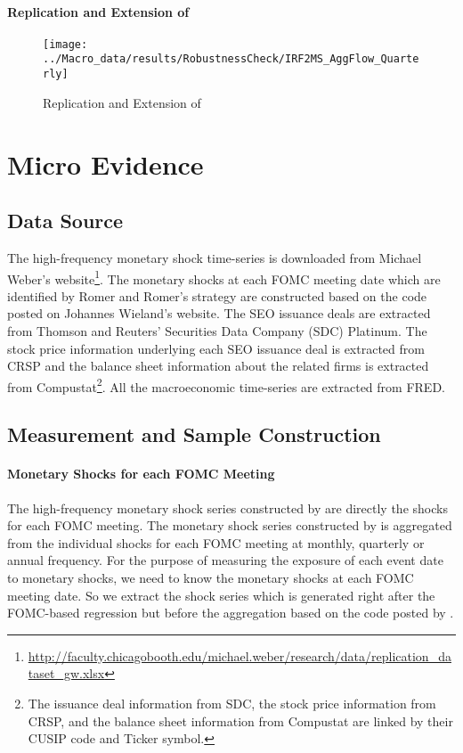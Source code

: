 \documentclass[11pt]{article}
\begin{document}
\paragraph{Replication and Extension of \cite{RomerRomer:AER:2004}}
\begin{figure}
	\centering
	\texttt{[image: ../Macro\_data/results/RobustnessCheck/IRF2MS\_AggFlow\_Quarterly]}
	\caption{Replication and Extension of \cite{RomerRomer:AER:2004}}
	\label{fig:irf2msaggflowquarterly}
\end{figure}

\section{Micro Evidence}

\subsection{Data Source}
The high-frequency monetary shock time-series is downloaded from Michael Weber's website\footnote{\url{http://faculty.chicagobooth.edu/michael.weber/research/data/replication_dataset_gw.xlsx}}. The monetary shocks at each FOMC meeting date which are identified by Romer and Romer's strategy are constructed based on the code posted on Johannes Wieland's website.  The SEO issuance deals are extracted from Thomson and Reuters' Securities Data Company (SDC) Platinum. The stock price information underlying each SEO issuance deal is extracted from CRSP and the balance sheet information about the related firms is extracted from Compustat\footnote{The issuance deal information from SDC, the stock price information from CRSP, and the balance sheet information from Compustat are linked by their CUSIP code and Ticker symbol.}. All the macroeconomic time-series are extracted from FRED.
\subsection{Measurement and Sample Construction}

\paragraph{Monetary Shocks for each FOMC Meeting} The high-frequency monetary shock series constructed by \cite{GorodnichenkoWeber:AER:2016} are directly the shocks for each FOMC meeting. The monetary shock series constructed by \cite{WielandYang:NBER:2016} is aggregated from the individual shocks for each FOMC meeting at monthly, quarterly or annual frequency. For the purpose of measuring the exposure of each event date to monetary shocks, we need to know the monetary shocks at each FOMC meeting date. So we extract the shock series which is generated right after the FOMC-based regression but before the aggregation based on the code posted by \cite{WielandYang:NBER:2016}.
\end{document}
